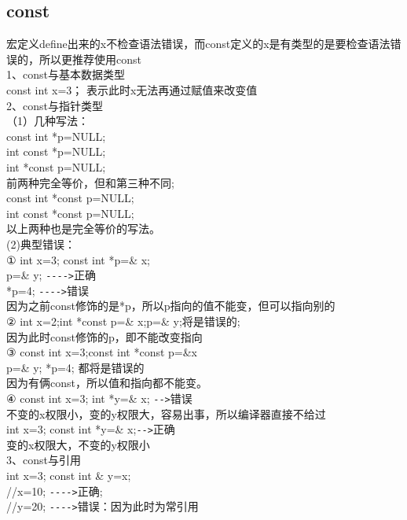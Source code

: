 \documentclass[a4paper,12pt]{article}
\begin{document}
\begin{CJK*}{UTF8}{gbsn}
\section{const}
\begin{flushleft} 
宏定义define出来的x不检查语法错误，而const定义的x是有类型的是要检查语法错误的，所以更推荐使用const\\
1、const与基本数据类型\\
\quad const int x=3； 表示此时x无法再通过赋值来改变值\\
2、const与指针类型\\
（1）几种写法：\\
\quad const int *p=NULL;\\
\quad int const *p=NULL;\\
\quad int *const p=NULL;\\
前两种完全等价，但和第三种不同;\\
\quad const int *const p=NULL;\\
\quad int const *const p=NULL;\\
以上两种也是完全等价的写法。\\
 (2)典型错误：\\
①  int x=3; const int *p=\& x;\\
 p=\& y;  \verb|---->|正确\\
 *p=4;   \verb|---->|错误\\ 因为之前const修饰的是*p，所以p指向的值不能变，但可以指向别的\\
②  int x=2;int *const p=\& x;p=\& y;将是错误的;\\
因为此时const修饰的p，即不能改变指向\\
③  const int x=3;const int *const p=\&x \\
    p=\& y; *p=4; 都将是错误的  \\
    因为有俩const，所以值和指向都不能变。\\
④  const int x=3; int *y=\& x; \verb|-->|错误\\
    不变的x权限小，变的y权限大，容易出事，所以编译器直接不给过\\
    int x=3;  const int *y=\& x;\verb|-->|正确\\
    变的x权限大，不变的y权限小\\
3、const与引用\\
int x=3; const int \& y=x;\\
//x=10;  \verb|---->|正确;\\
//y=20;  \verb|---->|错误：因为此时为常引用\\
\end{flushleft}



\end{CJK*}
\end{document}
